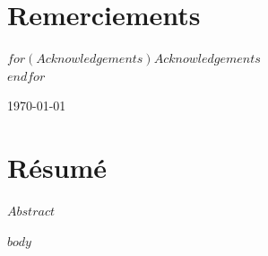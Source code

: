\documentclass[mstat,12pt]{unswthesis}
\renewcommand{\prefacesection}[1]{%
        \chapter*{\textcolor{upvblue}{#1}}
        \begin{center}\upvline\end{center}
    }
\begin{document}


\prefacesection{Remerciements}


\begin{center}
\begin{minipage}{0.86\textwidth}
\centering
{\bigskip}$for(Acknowledgements)$$Acknowledgements$\\[0.8cm] $endfor$
\end{minipage}
\end{center}

{\bigskip\bigskip\begin{center}\today\end{center}}



\prefacesection{Résumé}

\begin{center}
\begin{minipage}{0.86\textwidth}
\justifying
$Abstract$
\end{minipage}
\end{center}



\afterpreface





%
%






$body$
\end{document}
